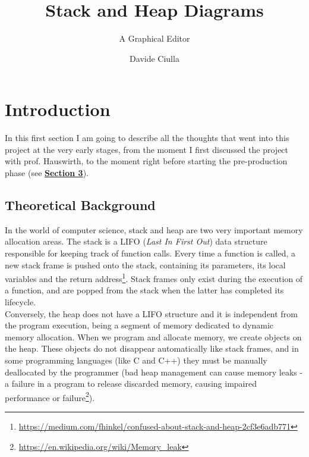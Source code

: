 \documentclass[]{usiinfbachelorproject}
\author{Davide Ciulla}
\title{Stack and Heap Diagrams}
\subtitle{A Graphical Editor}
\begin{document}
\maketitle


\tableofcontents
\newpage


\section{Introduction} \label{introduction}

In this first section I am going to describe all the thoughts that went into this project at the very early stages, from the moment I first discussed the project with prof. Hauswirth, to the moment right before starting the pre-production phase (see \hyperref[requirements+analysis]{\textbf{Section 3}}).

\subsection{Theoretical Background}

\noindent In the world of computer science, stack and heap are two very important memory allocation areas. The stack is a LIFO (\emph{Last In First Out}) data structure responsible for keeping track of function calls. Every time a function is called, a new stack frame is pushed onto the stack, containing its parameters, its local variables
 and the return address\footnote{\url{https://medium.com/fhinkel/confused-about-stack-and-heap-2cf3e6adb771}}. Stack frames only exist during the execution of a function, and are popped from the stack when the latter has completed its lifecycle.\\
 Conversely, the heap does not have a LIFO structure and it is independent from the program execution, being a segment of memory dedicated to dynamic memory allocation. When we program and allocate memory, we create objects on the heap. These objects do not disappear automatically like stack frames, and in some programming languages (like C and C++) they must be manually deallocated by the programmer (bad heap management can cause memory leaks - a failure in a program to release discarded memory, causing impaired performance or failure\footnote {\url{https://en.wikipedia.org/wiki/Memory_leak}}).\\
 
\end{document}
